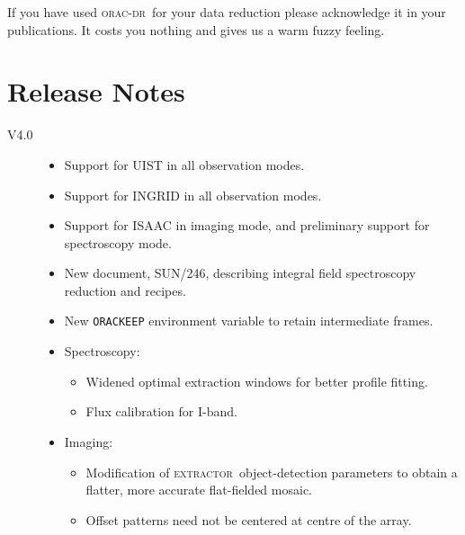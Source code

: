 \documentclass[twoside,11pt]{article}
\newcommand{\xref}[3]{#1}
\renewcommand{\_}{\texttt{\symbol{95}}}
\newcommand{\oracdr}{\textsc{orac-dr}}
\newcommand{\extractor}{\xref{\textsc{extractor}}{sun226}{}}
\begin{document}
If you have used \oracdr\ for your data reduction please acknowledge it
in your publications.  It costs you nothing and gives us a warm fuzzy
feeling.


\section{Release Notes}

\begin{description}

\item[V4.0]

\begin{itemize}

\item Support for UIST in all observation modes.

\item Support for INGRID in all observation modes.

\item Support for ISAAC in imaging mode, and preliminary support for
    spectroscopy mode.

\item New document, \xref{SUN/246}{sun246}{}, describing integral field spectroscopy reduction and recipes.
  
\item New \texttt{ORAC\_KEEP} environment variable to retain intermediate
  frames.

\item Spectroscopy:

\begin{itemize}

\item Widened optimal extraction windows for better profile fitting.

\item Flux calibration for I-band.

\end{itemize}

\item Imaging:

\begin{itemize}

\item Modification of \extractor\ object-detection parameters to obtain a
    flatter, more accurate flat-fielded mosaic.

\item Offset patterns need not be centered at centre of the array.


\end{itemize}
\end{itemize}
\end{description}
\end{document}
